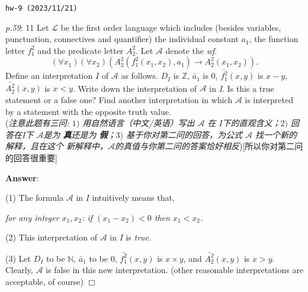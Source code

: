 \documentclass[UTF8,12pt,a4paper]{ctexart}
\begin{document}
\noindent\texttt{hw-9 (2023/11/21)}

\emph{p.59}: 11 \quad
Let $\mathscr{L}$ be the first order language which includes (besides variables, punctuation, 
connectives and quantifier) the individual constant $a_1$, the function letter $f^2_1$ and the predicate letter $A^2_2$. 
Let $\mathscr{A}$ denote the \textit{wf}.
\[
(\forall x_1)(\forall x_2)( A^2_2 ( f^2_1(x_1,x_2), a_1)  \to A^2_2 (x_1,x_2) ).
\]
Define an interpretation $I$ of $\mathscr{A}$ as follows. 
$D_I$ is $\mathbb{Z}$, $\bar{a}_1$ is $0$, $\bar{f^2_1} (x, y)$ is $x-y$, 
$\bar{A^2_2}(x,y)$ is $x < y$. 
Write down the interpretation of $\mathscr{A}$ in \textit{I}. 
Is this a true statement or a false one? 
Find another interpretation in which $\mathscr{A}$ is interpreted by a statement with the opposite truth value. \\
(\textit{注意此题有三问: $1)$ 用自然语言（中文/英语）写出 $\mathscr{A}$ 在 $I$下的直观含义；$2)$ 回答在\textit{I}下 $\mathscr{A}$是为\textbf{{\color{purple} 真}}还是为\textbf{{\color{purple} 假}}；$3)$ 基于你对第二问的回答，为公式 $\mathscr{A}$ 找一个新的解释，且在这个{\color{purple} 新}解释中，$\mathscr{A}$的真值与你第二问的答案恰好相反})[所以你对第二问的回答很重要]

\noindent\textbf{Answer}:   

(1) The formula $\mathscr{A}$ in $I$ intuitively means that, 

\hspace{6em} \textit{for any integer $x_1, x_2$: if  $(x_1 - x_2) < 0$ then $x_1 < x_2$.}


(2) This interpretation of $\mathscr{A}$ in $I$ is {\color{purple} \textit{true}}. 


(3) Let $D_I$ to be $\mathbb{N}$, $\bar{a}_1$ to be $0$, $\bar{f^2_1} (x, y)$ is $x \times y$, and $\bar{A^2_2}(x,y)$ is $x > y$. 
Clearly, $\mathscr{A}$ is {\color{purple} false} in this new interpretation. 
(other reasonable interpretations are acceptable, of course)
\hfill $\Box$
\end{document}
